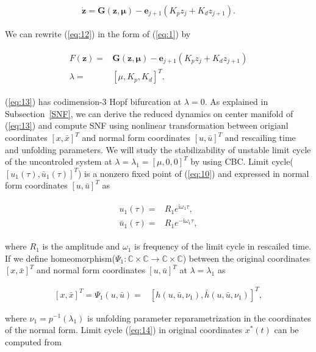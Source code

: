 \documentclass[openacc]{rsproca_new}%
\def\complex{\mathbb{C}}
\def\vec#1{\ensuremath{\mathbf{#1}}}
\newcommand{\Eref}[1]{(\ref{#1})}
\newcommand{\Ssref}[1]{Subsection~\ref{#1}}
\begin{document}
\begin{align}\label{eq:12}
    \dot{\vec{z}} =\vec{G}(\vec{z},\vec{\mu})-\vec{e}_{j+1}(K_p z_j+K_d z_{j+1}).
\end{align}

\noindent We can rewrite \Eref{eq:12} in the form of \Eref{eq:1} by

\begin{align}\label{eq:13}
\begin{split}
  F({\vec{z}})=&\vec{G}(\vec{z},\vec{\mu})-\vec{e}_{j+1}(K_pz_j+K_d z_{j+1})\\
  \lambda=&[\mu,K_p,K_d]^T.
\end{split}
\end{align}

\noindent \Eref{eq:13} has codimension-3 Hopf bifurcation at $\lambda=0$. As explained in \Ssref{SNF}, we can derive the reduced dynamics on center manifold of \Eref{eq:13} and compute SNF using nonlinear transformation between origianl coordinates $[x,\bar x]^T$ and normal form coordinates $[u,\bar u]^T$ and rescailing time and unfolding parameters. We will study the stabilizability of unstable limit cycle of the uncontroled system at $\lambda=\lambda_1=[\mu,0,0]^T$ by using CBC. Limit cycle($[u_1(\tau),\bar u_1(\tau)]^T$) is a nonzero fixed point of \Eref{eq:10} and expressed in normal form coordinates $[u,\bar u]^T$ as

\begin{align}\label{eq:14}
  \begin{split}
      u_1(\tau)=&R_1e^{\textrm{i}\omega_1 \tau},\\
      \bar u_1(\tau)=&R_1e^{-\textrm{i}\omega_1 \tau},
    \end{split}
\end{align}

\noindent where $R_1$ is the amplitude and $\omega_1$ is frequency of the limit cycle in rescailed time. If we define homeomorphism($\Psi_1:\complex\times\complex\rightarrow\complex\times\complex$) between the original coordinates $[x,\bar x]^T$ and normal form coordinates $[u,\bar u]^T$ at $\lambda=\lambda_1$ as

\begin{align}\label{eq:15}
    [x,\bar x]^T=\Psi_1(u,\bar u)=&[h(u,\bar u,\nu_1),\bar h(u,\bar u,\nu_1)]^T,
\end{align}

\noindent  where $\nu_1=p^{-1}(\lambda_1)$ is unfolding parameter reparametrization in the coordinates of the normal form. Limit cycle \Eref{eq:14} in original coordinates $x^*(t)$ can be computed from
\end{document}
